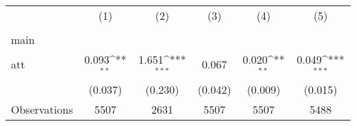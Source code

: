 {
\def\sym#1{\ifmmode^{#1}\else\(^{#1}\)\fi}
\begin{tabular}{l*{5}{c}}
\hline\hline
                    &\multicolumn{1}{c}{(1)}&\multicolumn{1}{c}{(2)}&\multicolumn{1}{c}{(3)}&\multicolumn{1}{c}{(4)}&\multicolumn{1}{c}{(5)}\\
                    &\multicolumn{1}{c}{} &\multicolumn{1}{c}{} &\multicolumn{1}{c}{} &\multicolumn{1}{c}{} &\multicolumn{1}{c}{} \\
\hline
main                &                     &                     &                     &                     &                     \\
att                 &       0.093\sym{**} &       1.651\sym{***}&       0.067         &       0.020\sym{**} &       0.049\sym{***}\\
                    &     (0.037)         &     (0.230)         &     (0.042)         &     (0.009)         &     (0.015)         \\
\hline
Observations        &        5507         &        2631         &        5507         &        5507         &        5488         \\
\hline\hline
\end{tabular}
}
